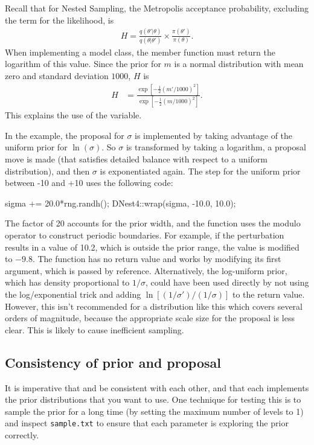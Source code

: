 \documentclass[article]{jss}
\newcommand{\params}{\theta}
\begin{document}
Recall that for Nested Sampling, the Metropolis acceptance probability,
excluding the term for the likelihood, is
\begin{align}
H = \frac{q(\params'|\params)}{q(\params | \params')}
\times \frac{\pi(\params')}{\pi(\params)}.
\end{align}
When implementing a model class, the
member function must return the logarithm of this value.
Since the prior for $m$ is a normal distribution with
mean zero and standard deviation $1000$, $H$ is
\begin{align}
H &= \frac{\exp\left[-\frac{1}{2}(m'/1000)^2\right]}
{\exp\left[-\frac{1}{2}(m/1000)^2\right]}.
\end{align}
This explains the use of the  variable.

In the example, the proposal for $\sigma$ is implemented by taking advantage
of the uniform prior for $\ln(\sigma)$. So $\sigma$ is transformed by
taking a logarithm, a proposal move is made (that satisfies detailed balance
with respect to a uniform distribution), and then $\sigma$ is exponentiated
again. The step for the uniform prior between -10 and +10
uses the following code:
\begin{CodeChunk}
\begin{CodeInput}
sigma += 20.0*rng.randh();
DNest4::wrap(sigma, -10.0, 10.0);
\end{CodeInput}
\end{CodeChunk}
The factor of 20 accounts for the prior width, and
the  function uses the modulo operator
to construct periodic boundaries. For example, if the perturbation results
in a value of 10.2, which is outside the prior range, the value is modified to
$-9.8$.
The  function has no return value and works by modifying its
first argument, which is passed by reference.
Alternatively, the log-uniform prior, which has density proportional
to $1/\sigma$, could have been used directly by not using the log/exponential
trick and adding $\ln\left[(1/\sigma')/(1/\sigma)\right]$ to the
return value. However, this isn't recommended for a distribution like this
which covers several orders of magnitude, because the appropriate scale size
for the proposal is less clear. This is likely to cause inefficient
sampling.

\subsection{Consistency of prior and proposal}
It is imperative that  and
be consistent with each other, and that each implements
the prior distributions that you want to use. One technique
for testing this is to sample the prior for a long time
(by setting the maximum number of levels to 1) and inspect
{\tt sample.txt} to ensure that each parameter is exploring
the prior correctly.
\end{document}
